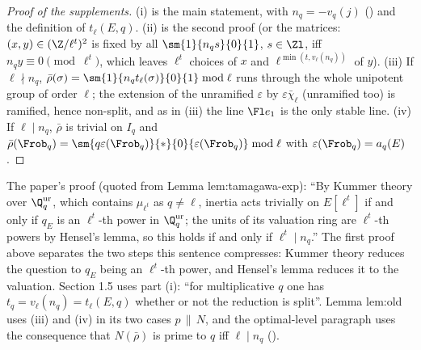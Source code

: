 \begin{proof}[Proof of the supplements]
(i) is the main statement, with $n_q=-v_q(j)$ () and the definition of $t_\ell(E,q)$. (ii) is the second proof (or the
matrices: $(x,y)\in(\Z/\ell^t)^2$ is fixed by all $\sm{1}{n_qs}{0}{1}$, $s\in\Zl$, iff $n_qy\equiv0\pmod{\ell^t}$, which leaves $\ell^t$ choices of $x$ and
$\ell^{\min(t,v_\ell(n_q))}$ of $y$). (iii) If $\ell\nmid n_q$, $\bar\rho(\sigma)=\sm{1}{n_qt_\ell(\sigma)}{0}{1}\bmod\ell$ runs through the whole unipotent group of order
$\ell$; the extension of the unramified $\varepsilon$ by $\varepsilon\bar\chi_\ell$ (unramified too) is ramified, hence non-split, and as in
(iii) the line $\Fl e_1$ is the only stable line. (iv) If $\ell\mid n_q$, $\bar\rho$ is trivial on $I_q$ and
$\bar\rho(\Frob_q)=\sm{q\varepsilon(\Frob_q)}{*}{0}{\varepsilon(\Frob_q)}\bmod\ell$ with $\varepsilon(\Frob_q)=a_q(E)$.
\end{proof}

\begin{paperlink}
The paper's proof (quoted from Lemma lem:tamagawa-exp): ``By Kummer theory over $\Q_q^{\mathrm{ur}}$, which contains $\mu_{\ell^t}$ as $q\ne\ell$,
inertia acts trivially on $E[\ell^t]$ if and only if $q_E$ is an $\ell^t$-th power in $\Q_q^{\mathrm{ur}}$; the units of its valuation ring are $\ell^t$-th
powers by Hensel's lemma, so this holds if and only if $\ell^t\mid n_q$.'' The first proof above separates the two steps this sentence
compresses: Kummer theory reduces the question to $q_E$ being an $\ell^t$-th power, and Hensel's lemma reduces it to the valuation. Section 1.5
uses part (i): ``for multiplicative $q$ one has $t_q=v_\ell(n_q)=t_\ell(E,q)$ whether or not the reduction is split''. Lemma lem:old uses (iii)
and (iv) in its two cases $p\,\|\,N$, and the optimal-level paragraph uses the consequence that $N(\bar\rho)$ is prime to $q$ iff $\ell\mid n_q$
().
\end{paperlink}

